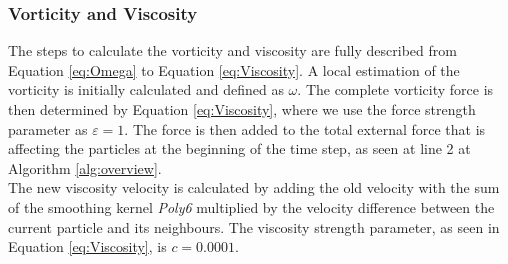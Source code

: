 \subsubsection{Vorticity and Viscosity}
The steps to calculate the vorticity and viscosity are fully described from Equation \ref{eq:Omega} to Equation \ref{eq:Viscosity}.
A local estimation of the vorticity is initially calculated and defined as $\omega$. The complete vorticity force is then determined 
by Equation \ref{eq:Viscosity}, where we use the force strength parameter as $\varepsilon = 1$. The force is then added to the total 
external force that is affecting the particles at the beginning of the time step, as seen at line 2 at Algorithm \ref{alg:overview}. 
\\
The new viscosity velocity is calculated by adding the old velocity with the sum of the smoothing kernel \textit{Poly6} multiplied by the velocity difference between 
the current particle and its neighbours. The viscosity strength parameter, as seen in Equation \ref{eq:Viscosity}, is $c = 0.0001$. 